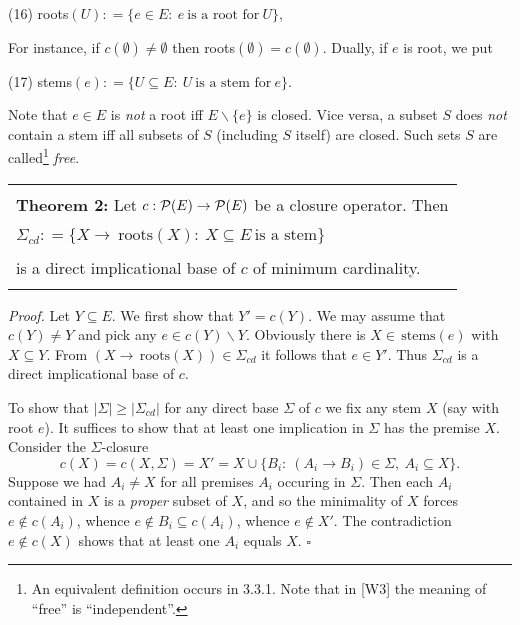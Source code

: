 \documentclass[11pt]{article}
\newcommand{\ra}{\rightarrow}
\begin{document}
(16) \quad roots$(U) : = \{ e \in E: \ e \ \mbox{is a root for} \ U\}$,

For instance, if $c(\emptyset) \neq \emptyset$ then roots$(\emptyset) = c(\emptyset)$. Dually, if $e$ is root, we put

(17) \quad stems$(e): = \{U \subseteq E: \ U \ \mbox{is a stem for} \ e \}$.

Note that $e \in E$ is {\it not} a root iff $E \backslash \{e\}$ is closed. Vice versa, a subset $S$ does {\it not} contain a stem iff all subsets of $S$ (including $S$ itself) are closed. Such sets $S$ are called\footnote{An equivalent definition occurs in 3.3.1. Note that in [W3] the meaning of ``free''  is ``independent''.} {\it free}.

\begin{tabular}{|l|} \hline \\
{\bf Theorem 2:} Let $c : {\cal P}(E) \ra {\cal P}(E)$ be a closure operator. Then\\
\\
\hspace*{3cm} $\Sigma_{cd}: = \{X \ra \ \mbox{roots}(X) : \ X \subseteq E \ \mbox{is a stem} \}$\\
\\
is a direct implicational base of $c$ of minimum cardinality.\\ \\ \hline \end{tabular}


{\it Proof.} Let $Y \subseteq E$. We first show that $Y' = c(Y)$. We may assume that $c(Y) \neq Y$ and pick any $e \in c(Y) \backslash Y$. Obviously there is $X \in \, \mbox{stems}(e)$ with $X \subseteq Y$. From $(X \ra \, \mbox{roots}(X)) \in \Sigma_{cd}$ it follows that $e \in Y'$. Thus $\Sigma_{cd}$ is a direct implicational base of $c$.

To show that $|\Sigma| \geq |\Sigma_{cd}|$  for any direct base $\Sigma$ of $c$ we fix any stem $X$ (say with root $e$).  It suffices to show that at least one implication in $\Sigma$ has the premise $X$. Consider the $\Sigma$-closure
$$c(X) = c(X, \Sigma)=X' = X \cup \{B_i : \ (A_i \ra B_i) \in \Sigma, \ A_i \subseteq X\}.$$
Suppose we had $A_i \neq X$ for all premises $A_i$ occuring in $\Sigma$. Then each $A_i$ contained in $X$ is a {\it proper} subset of $X$, and so the minimality of $X$ forces $e \not\in c(A_i)$, whence $e \not\in B_i \subseteq c(A_i)$, whence $e \not\in X'$. The contradiction $e \not\in c(X)$ shows that at least one $A_i$ equals $X$.  \quad $\square$
\end{document}
